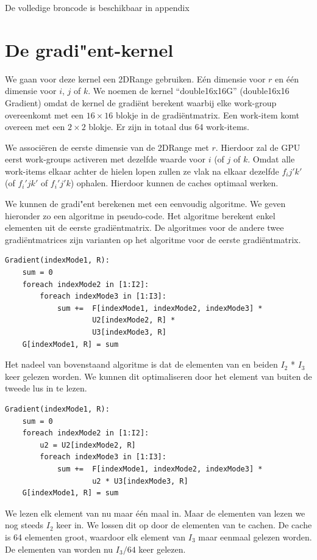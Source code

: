 De volledige broncode is beschikbaar in appendix %

\section{De gradi"ent-kernel}
We gaan voor deze kernel een 2DRange gebruiken. E\'en dimensie voor $r$ en \'e\'en dimensie voor $i$, $j$ of $k$. We noemen de kernel ``double16x16G'' (double16x16 Gradient) omdat de kernel de gradi\"ent berekent waarbij elke work-group overeenkomt met een $16 \times 16$ blokje in de gradi\"entmatrix. Een work-item komt overeen met een $2 \times 2$ blokje. Er zijn in totaal dus 64 work-items.

We associ\"eren de eerste dimensie van de 2DRange met $r$. Hierdoor zal de GPU eerst work-groups activeren met dezelfde waarde voor $i$ (of $j$ of $k$. Omdat alle work-items elkaar achter de hielen lopen zullen ze vlak na elkaar dezelfde $f_ij'k'$ (of $f_i'jk'$ of $f_i'j'k$) ophalen. Hierdoor kunnen de caches optimaal werken.

We kunnen de gradi"ent berekenen met een eenvoudig algoritme. We geven hieronder zo een algoritme in pseudo-code. Het algoritme berekent enkel elementen uit de eerste gradi\"entmatrix. De algoritmes voor de andere twee gradi\"entmatrices zijn varianten op het algoritme voor de eerste gradi\"entmatrix.
\begin{lstlisting}
Gradient(indexMode1, R):
	sum = 0
	foreach indexMode2 in [1:I2]:
		foreach indexMode3 in [1:I3]:
			sum += 	F[indexMode1, indexMode2, indexMode3] *
					U2[indexMode2, R] *
					U3[indexMode3, R]
	G[indexMode1, R] = sum
\end{lstlisting}

Het nadeel van bovenstaand algoritme is dat de elementen van  en  beiden $I_2$ * $I_3$ keer gelezen worden. We kunnen dit optimaliseren door het element van  buiten de tweede lus in te lezen.

\begin{lstlisting}
Gradient(indexMode1, R):
	sum = 0
	foreach indexMode2 in [1:I2]:
		u2 = U2[indexMode2, R]
		foreach indexMode3 in [1:I3]:
			sum += 	F[indexMode1, indexMode2, indexMode3] *
					u2 * U3[indexMode3, R]
	G[indexMode1, R] = sum
\end{lstlisting}

We lezen elk element van  nu maar \'e\'en maal in. Maar de elementen van  lezen we nog steeds $I_2$ keer in.
We lossen dit op door de elementen van  te cachen. De cache is 64 elementen groot, waardoor elk element van $I_3$ maar eenmaal gelezen worden. De elementen van  worden nu $I_3/64$ keer gelezen.

